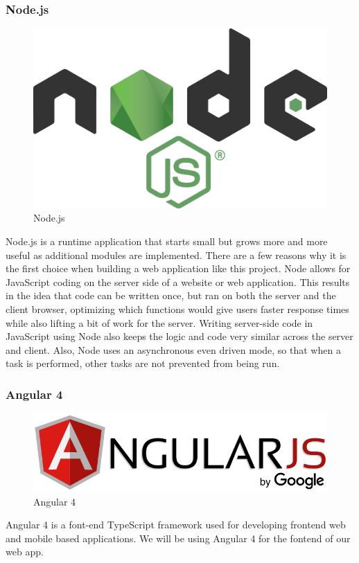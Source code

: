 \documentclass[12pt,a4paper]{report}
\begin{document}
			\subsubsection{Node.js}
			\begin{figure}
				\includegraphics[scale=0.06]{nodeJS}
				\caption{Node.js}
				\label{fig: Node.js}
			\end{figure}
			Node.js is a runtime application that starts small but grows more and more useful as additional modules are implemented. There are a few reasons why it is the first choice when building a web application like this project. Node allows for JavaScript coding on the server side of a website or web application. This results in the idea that code can be written once, but ran on both the server and the client browser, optimizing which functions would give users faster response times while also lifting a bit of work for the server. Writing server-side code in JavaScript using Node also keeps the logic and code very similar across the server and client. Also, Node uses an asynchronous even driven mode, so that when a task is performed, other tasks are not prevented from being run.
	
			\subsubsection{Angular 4}
			\begin{figure}
				\includegraphics[scale=.25]{angular_js}
				\caption{Angular 4}
				\label{fig: Angular 4}
			\end{figure}
			\lipsum[1]
			Angular 4 is a font-end TypeScript framework used for developing frontend web and mobile based applications. We will be using Angular 4 for the fontend of our web app.  
	
\end{document}
